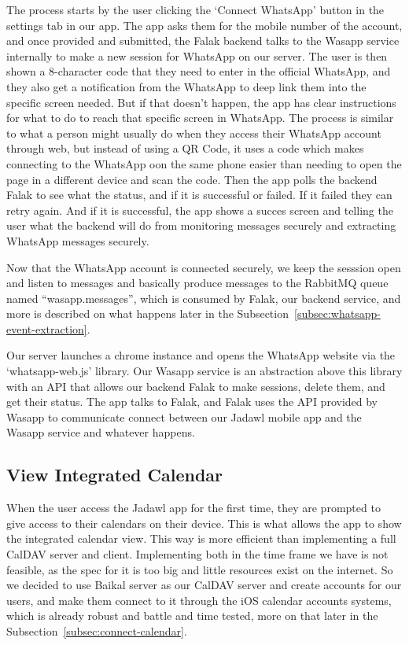 The process starts by the user clicking the `Connect WhatsApp' button in the settings tab in our app. The app asks them for the mobile number of the account, and once provided and submitted, the Falak backend talks to the Wasapp service internally to make a new session for WhatsApp on our server. The user is then shown a 8-character code that they need to enter in the official WhatsApp, and they also get a notification from the WhatsApp to deep link them into the specific screen needed. But if that doesn't happen, the app has clear instructions for what to do to reach that specific screen in WhatsApp. The process is similar to what a person might usually do when they access their WhatsApp account through web, but instead of using a QR Code, it uses a code which makes connecting to the WhatsApp oon the same phone easier than needing to open the page in a different device and scan the code. Then the app polls the backend Falak to see what the status, and if it is successful or failed. If it failed they can retry again. And if it is successful, the app shows a succes screen and telling the user what the backend will do from monitoring messages securely and extracting WhatsApp messages securely.

Now that the WhatsApp account is connected securely, we keep the sesssion open and listen to messages and basically produce messages to the RabbitMQ queue named ``wasapp.messages'', which is consumed by Falak, our backend service, and more is described on what happens later in the Subsection~\ref{subsec:whatsapp-event-extraction}.

Our server launches a chrome instance and opens the WhatsApp website via the `whatsapp-web.js' library. Our Wasapp service is an abstraction above this library with an API that allows our backend Falak to make sessions, delete them, and get their status. The app talks to Falak, and Falak uses the API provided by Wasapp to communicate connect between our Jadawl mobile app and the Wasapp service and whatever happens.

\subsection{View Integrated Calendar}

When the user access the Jadawl app for the first time, they are prompted to give access to their calendars on their device. This is what allows the app to show the integrated calendar view. This way is more efficient than implementing a full CalDAV server and client. Implementing both in the time frame we have is not feasible, as the spec for it is too big and little resources exist on the internet. So we decided to use Baikal server as our CalDAV server and create accounts for our users, and make them connect to it through the iOS calendar accounts systems, which is already robust and battle and time tested, more on that later in the Subsection~\ref{subsec:connect-calendar}.

